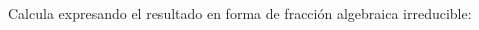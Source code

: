 \documentclass[addpoints,spanish, 12pt,a4paper]{exam}
\begin{document}
\begin{questions}
\begin{multicols}{1}
        \end{multicols}
        \question Calcula expresando el resultado en forma de fracción algebraica irreducible:
        \begin{multicols}{1} 
        \end{multicols}
        
    \end{questions}
    
\end{document}
